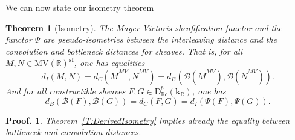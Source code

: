\documentclass[a4paper, english, 11pt]{article}
\newcommand{\kk}[0]{\textbf{k}}
\newcommand{\0}{\vec{0}}
\newcommand{\R}[0]{\mathbb{R}}
\newcommand{\D}[0]{\text{D}}
\newcommand{\s}{\textbf{sf}}
\newtheorem*{pf}{Proof.} }
\newtheorem{thm}[prop]{Theorem}
\begin{document}
We can now state our isometry theorem
\begin{thm}[Isometry]\label{T:MainIsometry} The Mayer-Vietoris sheafification functor and the functor $\Psi$ are pseudo-isometries between the interleaving distance and the convolution and bottleneck distances for sheaves. That is, for all $M, N \in \mbox{MV}(\R)^\s$,  one has equalities 
$$d_I(M, N) = d_C (\overline{M}^{MV}, \overline{N}^{MV}) = d_B(\mathcal{B}(\overline{M}^{MV}), \mathcal{B}(\overline{N}^{MV})). $$ 
And for all constructible sheaves $F, G \in \D^b_{\R c}(\kk_\R)$, one has 
$$ d_B(\mathcal{B}(F), \mathcal{B}(G)) = d_C(F,G) =d_I(\Psi(F), \Psi(G)).$$
\end{thm}
\begin{pf}Theorem~\ref{T:DerivedIsometry} implies already the equality between bottleneck and convolution distances. 


\end{pf}
\end{document}

